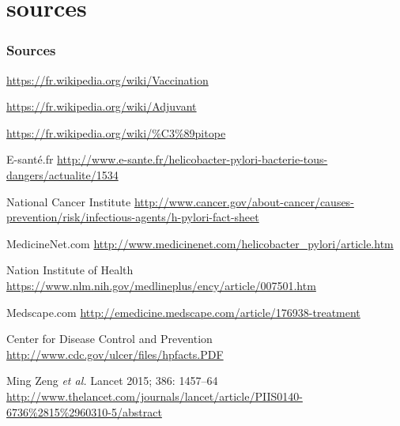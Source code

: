\documentclass[11pt]{beamer}
\begin{document}
\section*{sources}


\begin{frame}[allowframebreaks]
  \frametitle<presentation>{Sources}    
  \begin{thebibliography}{10}  
    \beamertemplateonlinebibitems
    \newblock \url{https://fr.wikipedia.org/wiki/Vaccination}
    
      \beamertemplateonlinebibitems
    \newblock \url{https://fr.wikipedia.org/wiki/Adjuvant}
    
          \beamertemplateonlinebibitems
    \newblock \url{https://fr.wikipedia.org/wiki/\%C3\%89pitope }
    
          \beamertemplateonlinebibitems
  E-santé.fr
    \newblock \url{http://www.e-sante.fr/helicobacter-pylori-bacterie-tous-dangers/actualite/1534 } 
   
 \beamertemplateonlinebibitems
  National Cancer Institute
    \newblock \url{http://www.cancer.gov/about-cancer/causes-prevention/risk/infectious-agents/h-pylori-fact-sheet}   
    
 \beamertemplateonlinebibitems
  MedicineNet.com
    \newblock \url{http://www.medicinenet.com/helicobacter_pylori/article.htm}      

 \beamertemplateonlinebibitems
  Nation Institute of Health
    \newblock \url{https://www.nlm.nih.gov/medlineplus/ency/article/007501.htm}   
    
   \beamertemplateonlinebibitems
  Medscape.com
    \newblock \url{http://emedicine.medscape.com/article/176938-treatment}       
        
   \beamertemplatearticlebibitems
  Center for Disease Control and Prevention
    \newblock \url{http://www.cdc.gov/ulcer/files/hpfacts.PDF}
    
       \beamertemplatearticlebibitems
  Ming Zeng {\em et al.}
    \newblock Lancet 2015; 386: 1457–64
    \newblock \url{http://www.thelancet.com/journals/lancet/article/PIIS0140-6736\%2815\%2960310-5/abstract}   
    

\end{thebibliography}
\end{frame}
\end{document}
